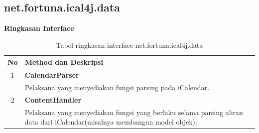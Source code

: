 \subsection{net.fortuna.ical4j.data}
\label{subs:net.fortuna.ical4j.data}
\noindent \textbf{Ringkasan Interface}
\begin{table}[H]
		\centering
		\caption{Tabel ringkasan interface net.fortuna.ical4j.data}
		\label{tab:net.fortuna.ical4j.data}
	\begin{tabular}{|c|p{12cm}|}
		\hline
		\textbf{No} & \textbf{Method dan Deskripsi} \\ \hline \hline
		1 & \textbf{CalendarParser}\\
			&	Pelaksana yang menyediakan fungsi parsing pada iCalendar.\\ \hline
		2 & \textbf{ContentHandler}\\
			&	Pelaksana yang menyediakan fungsi yang berlaku selama parsing aliran data dari iCalendar(misalnya membangun model objek).\\ \hline
	\end{tabular}
\end{table}
 

